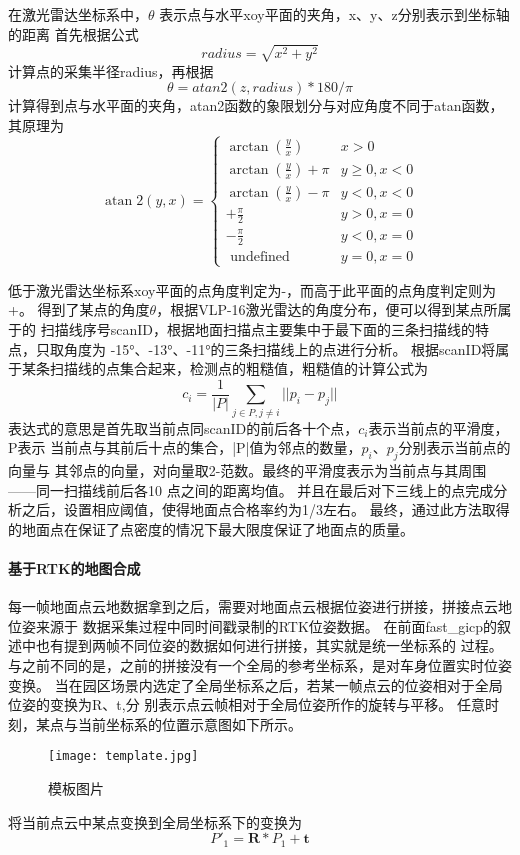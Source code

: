 在激光雷达坐标系中，$\theta$ 表示点与水平xoy平面的夹角，x、y、z分别表示到坐标轴的距离
首先根据公式
\begin{equation}
    radius = \sqrt{x^2 + y^2}
\end{equation}
计算点的采集半径radius，再根据
\begin{equation}
    \theta = atan2(z ,radius) * 180 / \pi 
\end{equation}
计算得到点与水平面的夹角，atan2函数的象限划分与对应角度不同于atan函数，其原理为
\begin{equation}
\operatorname{atan} 2(y, x)=\left\{\begin{array}{ll}
    \arctan \left(\frac{y}{x}\right) & x>0 \\
    \arctan \left(\frac{y}{x}\right)+\pi & y \geq 0, x<0 \\
    \arctan \left(\frac{y}{x}\right)-\pi & y<0, x<0 \\
    +\frac{\pi}{2} & y>0, x=0 \\
    -\frac{\pi}{2} & y<0, x=0 \\
    \text { undefined } & y=0, x=0
    \end{array}\right.
\end{equation}

低于激光雷达坐标系xoy平面的点角度判定为-，而高于此平面的点角度判定则为+。
得到了某点的角度$\theta$，根据VLP-16激光雷达的角度分布，便可以得到某点所属于的
扫描线序号scanID，根据地面扫描点主要集中于最下面的三条扫描线的特点，只取角度为
-15°、-13°、-11°的三条扫描线上的点进行分析。
根据scanID将属于某条扫描线的点集合起来，检测点的粗糙值，粗糙值的计算公式为
\begin{equation}
    c_i=\frac{1}{|P|}\sum_{j\in P, j \ne i }||p_i-p_j|| 
\end{equation}
表达式的意思是首先取当前点同scanID的前后各十个点，$c_i$表示当前点的平滑度，P表示
当前点与其前后十点的集合，|P|值为邻点的数量，$p_i$、$p_j$分别表示当前点的向量与
其邻点的向量，对向量取2-范数。最终的平滑度表示为当前点与其周围——同一扫描线前后各10
点之间的距离均值。
并且在最后对下三线上的点完成分析之后，设置相应阈值，使得地面点合格率约为1/3左右。
最终，通过此方法取得的地面点在保证了点密度的情况下最大限度保证了地面点的质量。

\paragraph{基于RTK的地图合成}
每一帧地面点云地数据拿到之后，需要对地面点云根据位姿进行拼接，拼接点云地位姿来源于
数据采集过程中同时间戳录制的RTK位姿数据。
在前面fast\_gicp的叙述中也有提到两帧不同位姿的数据如何进行拼接，其实就是统一坐标系的
过程。与之前不同的是，之前的拼接没有一个全局的参考坐标系，是对车身位置实时位姿变换。
当在园区场景内选定了全局坐标系之后，若某一帧点云的位姿相对于全局位姿的变换为R、t,分
别表示点云帧相对于全局位姿所作的旋转与平移。
任意时刻，某点与当前坐标系的位置示意图如下所示。
\begin{figure}[ht]
    \centering
    \texttt{[image: template.jpg]}
    \caption{模板图片}
\end{figure}
将当前点云中某点变换到全局坐标系下的变换为
\begin{equation}
    P'_1 = \symbf{R} * P_1 + \symbf{t}
\end{equation}



